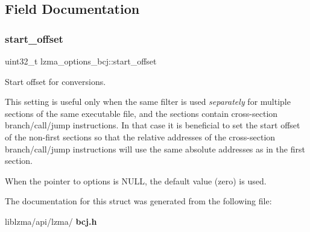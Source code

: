 \subsection{Field Documentation}
\mbox{\label{structlzma__options__bcj_a3f5a3c62cd82ce89433684f12ed096ac}} 
\subsubsection{start\+\_\+offset}
{\footnotesize\ttfamily uint32\+\_\+t lzma\+\_\+options\+\_\+bcj\+::start\+\_\+offset}



Start offset for conversions. 

This setting is useful only when the same filter is used {\itshape separately} for multiple sections of the same executable file, and the sections contain cross-\/section branch/call/jump instructions. In that case it is beneficial to set the start offset of the non-\/first sections so that the relative addresses of the cross-\/section branch/call/jump instructions will use the same absolute addresses as in the first section.

When the pointer to options is N\+U\+LL, the default value (zero) is used. 

The documentation for this struct was generated from the following file\+:\begin{DoxyCompactItemize}
\item 
liblzma/api/lzma/\textbf{ bcj.\+h}\end{DoxyCompactItemize}
